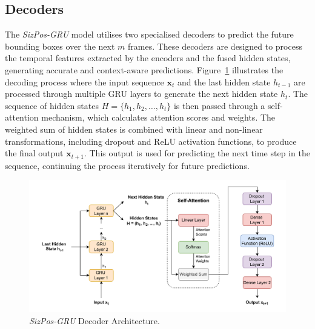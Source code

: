 \documentclass[12pt,oneside]{book} %
\begin{document}
\subsection{Decoders}
\noindent The \textit{SizPos-GRU} model utilises two specialised decoders to predict the future bounding boxes over the next \(m\) frames. These decoders are designed to process the temporal features extracted by the encoders and the fused hidden states, generating accurate and context-aware predictions. Figure~\ref{fig:sizpos-gru-decoder} illustrates the decoding process where the input sequence \( \mathbf{x}_t \) and the last hidden state \( h_{t-1} \) are processed through multiple GRU layers to generate the next hidden state \( h_t \). The sequence of hidden states \( H = \{h_1, h_2, \dots, h_t\} \) is then passed through a self-attention mechanism, which calculates attention scores and weights. The weighted sum of hidden states is combined with linear and non-linear transformations, including dropout and ReLU activation functions, to produce the final output \( \mathbf{x}_{t+1} \). This output is used for predicting the next time step in the sequence, continuing the process iteratively for future predictions.

\begin{figure}[H]
    \centering
    \includegraphics[width=1\textwidth]{figures/GRUSizPosDecoder.drawio.pdf}
    \caption{\textit{SizPos-GRU} Decoder Architecture.}
    \label{fig:sizpos-gru-decoder}
\end{figure}
\end{document}
